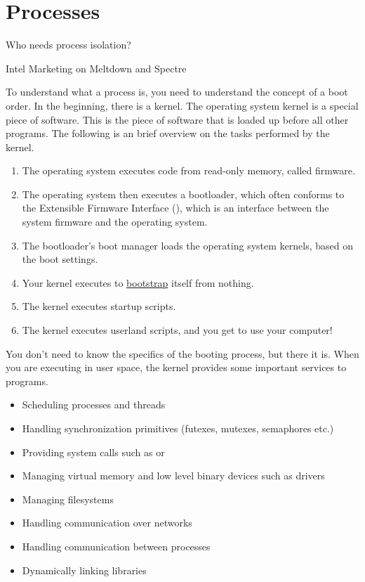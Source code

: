 \chapter{Processes}

\epigraph{Who needs process isolation?}{Intel Marketing on Meltdown and Spectre}

To understand what a process is, you need to understand the concept of a boot order.
In the beginning, there is a kernel.
The operating system kernel is a special piece of software.
This is the piece of software that is loaded up before all other programs.
The following is an brief overview on the tasks performed by the kernel.

\begin{enumerate}
    \item
          The operating system executes code from read-only memory, called firmware.
    \item
          The operating system then executes a bootloader, which often conforms to the Extensible Firmware Interface (), which is an interface between the system firmware and the operating system.
    \item
          The bootloader's boot manager loads the operating system kernels, based on the boot settings.
    \item
          Your kernel executes  to \href{https://en.wikipedia.org/wiki/Bootstrapping}{bootstrap} itself from nothing.
    \item
          The kernel executes startup scripts.
    \item
          The kernel executes userland scripts, and you get to use your computer!
\end{enumerate}

You don't need to know the specifics of the booting process, but there it is.
When you are executing in user space, the kernel provides some important services to programs.

\begin{itemize}
    \item Scheduling processes and threads
    \item Handling synchronization primitives (futexes, mutexes, semaphores etc.)
    \item Providing system calls such as  or 
    \item Managing virtual memory and low level binary devices such as  drivers
    \item Managing filesystems
    \item Handling communication over networks
    \item Handling communication between processes
    \item Dynamically linking libraries
\end{itemize}

